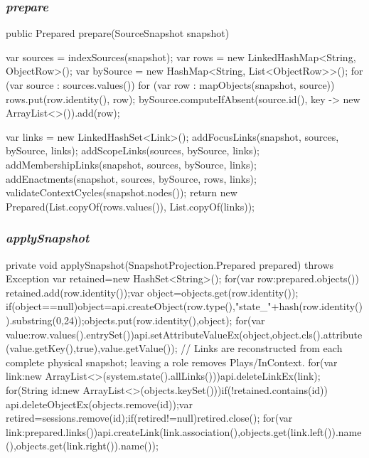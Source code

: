 \documentclass[12pt,a4paper,oneside]{extreport}
\begin{document}
\subsubsection*{\textit{prepare}}
\begin{thesiscode}[firstnumber=31]
public Prepared prepare(SourceSnapshot snapshot) {
    var sources = indexSources(snapshot);
    var rows = new LinkedHashMap<String, ObjectRow>();
    var bySource = new HashMap<String, List<ObjectRow>>();
    for (var source : sources.values()) {
        for (var row : mapObjects(snapshot, source)) {
            rows.put(row.identity(), row);
            bySource.computeIfAbsent(source.id(), key -> new ArrayList<>()).add(row);
        }
    }

    var links = new LinkedHashSet<Link>();
    addFocusLinks(snapshot, sources, bySource, links);
    addScopeLinks(sources, bySource, links);
    addMembershipLinks(snapshot, sources, bySource, links);
    addEnactments(snapshot, sources, bySource, rows, links);
    validateContextCycles(snapshot.nodes());
    return new Prepared(List.copyOf(rows.values()), List.copyOf(links));
}
\end{thesiscode}

\subsubsection*{\textit{applySnapshot}}
\begin{thesiscode}[firstnumber=142]
private void applySnapshot(SnapshotProjection.Prepared prepared) throws Exception {
    var retained=new HashSet<String>();
    for(var row:prepared.objects()) {
        retained.add(row.identity());var object=objects.get(row.identity());
        if(object==null){object=api.createObject(row.type(),"state_"+hash(row.identity()).substring(0,24));objects.put(row.identity(),object);}
        for(var value:row.values().entrySet())api.setAttributeValueEx(object,object.cls().attribute(value.getKey(),true),value.getValue());
    }
    // Links are reconstructed from each complete physical snapshot; leaving a role removes Plays/InContext.
    for(var link:new ArrayList<>(system.state().allLinks()))api.deleteLinkEx(link);
    for(String id:new ArrayList<>(objects.keySet()))if(!retained.contains(id)) {
            api.deleteObjectEx(objects.remove(id));var retired=sessions.remove(id);if(retired!=null)retired.close();
    }
    for(var link:prepared.links())api.createLink(link.association(),objects.get(link.left()).name(),objects.get(link.right()).name());
}
\end{thesiscode}
\end{document}
